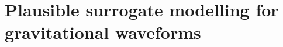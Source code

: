 \documentclass{kentigern}
\theoremstyle{definition}
\begin{document}


\chapter{Plausible surrogate modelling for gravitational waveforms}
\label{cha:heron}







%
%
%
% 




\printglossary

\medskip
\printbibliography[title={Bibliography}]
\end{document}
